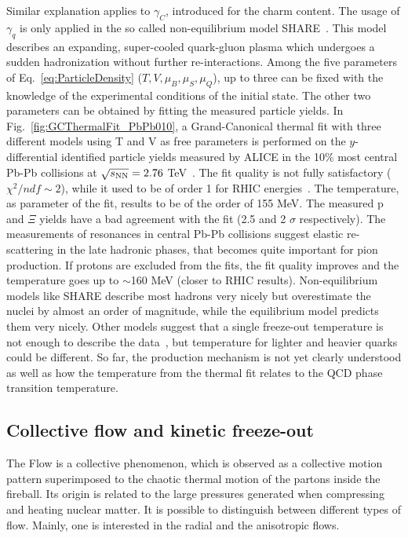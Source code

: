 Similar explanation applies to $\gamma_{C}$, introduced for the charm content.
The usage of $\gamma_{q}$ is only applied in the so called non-equilibrium model SHARE~\cite{Petran:2013lja}. This model describes an expanding, super-cooled quark-gluon plasma which undergoes a sudden hadronization without further re-interactions.
Among the five parameters of Eq.~\ref{eq:ParticleDensity} ($T, V, \mu_B, \mu_S, \mu_Q$), up to three can be fixed with the knowledge of the experimental conditions of the initial state. The other two parameters can be obtained by fitting the measured particle yields. In Fig.~\ref{fig:GCThermalFit_PbPb010}, a Grand-Canonical thermal fit with three different models using T and V as free parameters is performed on the $y$-differential identified particle yields measured by ALICE in the 10\% most central Pb-Pb collisions at $\sqrt{s_{\rm NN}} = 2.76$ TeV~\cite{Floris:2014pta}. The fit quality is not fully satisfactory ($\chi^{2}/ndf \sim 2$), while it used to be of order 1 for RHIC energies~\cite{Andronic:2008gu}. The temperature, as parameter of the fit, results to be of the order of 155 MeV. 
The measured p and $\Xi$ yields have a bad agreement with the fit (2.5 and 2 $\sigma$ respectively). The measurements of resonances in central Pb-Pb collisions suggest elastic re-scattering in the late hadronic phases, that becomes quite important for pion production. If protons are excluded from the fits, the fit quality improves and the temperature goes up to $\sim$160 MeV (closer to RHIC results). Non-equilibrium models like SHARE describe most hadrons very nicely but overestimate the nuclei by almost an order of magnitude, while the equilibrium model predicts them very nicely. Other models suggest that a single freeze-out temperature is not enough to describe the data~\cite{Bellwied:2013cta}, but temperature for lighter and heavier quarks could be different. So far, the production mechanism is not yet clearly understood as well as how the temperature from the thermal fit relates to the QCD phase transition temperature.

\subsection{Collective flow and kinetic freeze-out}
The Flow is a collective phenomenon, which is observed as a collective motion pattern superimposed to the chaotic thermal motion of the partons inside the fireball. Its origin is related to the large pressures generated when compressing and heating nuclear matter. It is possible to distinguish between different types of flow. Mainly, one is interested in the radial and the anisotropic flows. %
